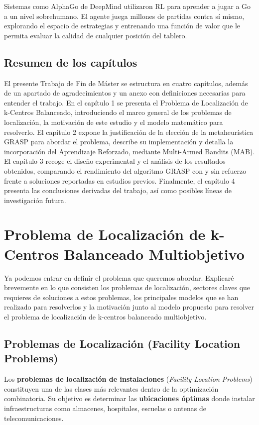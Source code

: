\documentclass[12pt,a4paper]{book}
\begin{document}
Sistemas como AlphaGo \cite{AlphaGo} de DeepMind utilizaron RL para aprender a jugar a Go a un nivel sobrehumano.
El agente juega millones de partidas contra sí mismo, explorando el espacio de estrategias y entrenando una función de valor que le permita evaluar la calidad de cualquier posición del tablero.


\section{Resumen de los capítulos}
El presente Trabajo de Fin de Máster se estructura en cuatro capítulos, además de un apartado de agradecimientos y un anexo con definiciones necesarias para entender el trabajo.
En el capítulo 1 se presenta el Problema de Localización de k-Centros Balanceado, introduciendo el marco general de los problemas de localización, la motivación de este estudio y el modelo matemático para resolverlo.
El capítulo 2 expone la justificación de la elección de la metaheurística GRASP para abordar el problema, describe su implementación y detalla la incorporación del Aprendizaje Reforzado, mediante Multi-Armed Bandits (MAB).
El capítulo 3 recoge el diseño experimental y el análisis de los resultados obtenidos, comparando el rendimiento del algoritmo GRASP con y sin refuerzo frente a soluciones reportadas en estudios previos.
Finalmente, el capítulo 4 presenta las conclusiones derivadas del trabajo, así como posibles líneas de investigación futura.

\chapter{Problema de Localización de k-Centros Balanceado Multiobjetivo}

Ya podemos entrar en definir el problema que queremos abordar. Explicaré brevemente en lo que consisten los problemas de localización, sectores claves que requieres de soluciones a 
estos problemas, los principales modelos que se han realizado para resolverlos y la motivación junto al modelo propuesto para resolver el problema de localización de k-centros balanceado multiobjetivo.

\section{Problemas de Localización (Facility Location Problems)}

Los \textbf{problemas de localización de instalaciones} (\textit{Facility Location Problems}) constituyen una de las clases más relevantes dentro de la optimización combinatoria. Su objetivo es determinar las \textbf{ubicaciones óptimas} donde instalar infraestructuras como almacenes, hospitales, escuelas o antenas de telecomunicaciones.
\end{document}
